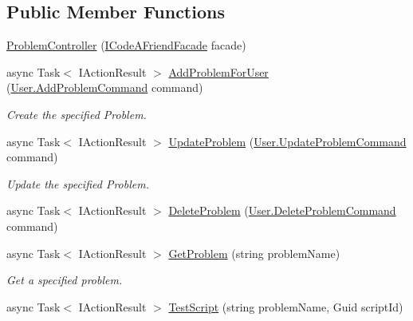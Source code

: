 \subsection*{Public Member Functions}
\begin{DoxyCompactItemize}
\item 
\mbox{\hyperlink{class_code_a_friend_1_1_api_service_1_1_controllers_1_1_problem_controller_a2f0d98d308a3adc0712b52b4fd3945de}{Problem\+Controller}} (\mbox{\hyperlink{interface_code_a_friend_1_1_facade_1_1_i_code_a_friend_facade}{I\+Code\+A\+Friend\+Facade}} facade)
\item 
async Task$<$ I\+Action\+Result $>$ \mbox{\hyperlink{class_code_a_friend_1_1_api_service_1_1_controllers_1_1_problem_controller_a9f87dcfa7186b6ea75f2ac690a06cdbe}{Add\+Problem\+For\+User}} (\mbox{\hyperlink{class_code_a_friend_1_1_data_model_1_1_user_1_1_add_problem_command}{User.\+Add\+Problem\+Command}} command)
\begin{DoxyCompactList}\small\item\em Create the specified Problem. \end{DoxyCompactList}\item 
async Task$<$ I\+Action\+Result $>$ \mbox{\hyperlink{class_code_a_friend_1_1_api_service_1_1_controllers_1_1_problem_controller_a3ae37d2a578e67e48c1b1a91894c61b0}{Update\+Problem}} (\mbox{\hyperlink{class_code_a_friend_1_1_data_model_1_1_user_1_1_update_problem_command}{User.\+Update\+Problem\+Command}} command)
\begin{DoxyCompactList}\small\item\em Update the specified Problem. \end{DoxyCompactList}\item 
async Task$<$ I\+Action\+Result $>$ \mbox{\hyperlink{class_code_a_friend_1_1_api_service_1_1_controllers_1_1_problem_controller_a2b8c284c32ccf82a763ee27a349d72b3}{Delete\+Problem}} (\mbox{\hyperlink{class_code_a_friend_1_1_data_model_1_1_user_1_1_delete_problem_command}{User.\+Delete\+Problem\+Command}} command)
\item 
async Task$<$ I\+Action\+Result $>$ \mbox{\hyperlink{class_code_a_friend_1_1_api_service_1_1_controllers_1_1_problem_controller_a27d7c0de93899d3c5a702ee508e909e8}{Get\+Problem}} (string problem\+Name)
\begin{DoxyCompactList}\small\item\em Get a specified problem. \end{DoxyCompactList}\item 
async Task$<$ I\+Action\+Result $>$ \mbox{\hyperlink{class_code_a_friend_1_1_api_service_1_1_controllers_1_1_problem_controller_a4107f49ce21903685fb213a32e62234e}{Test\+Script}} (string problem\+Name, Guid script\+Id)

\end{DoxyCompactItemize}
